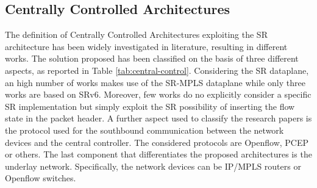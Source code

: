 \subsection{Centrally Controlled Architectures}
\label{sec:central_control}

The definition of Centrally Controlled Architectures exploiting the SR architecture has been widely investigated in literature, resulting in \ccaPapers different works.
The solution proposed has been classified on the basis of three different aspects, as reported in Table \ref{tab:central-control}. Considering the SR dataplane, an high number of works makes use of the SR-MPLS dataplane while only three works are based on SRv6. Moreover, few works do no explicitly consider a specific SR implementation but simply exploit the SR possibility of inserting the flow state in the packet header.
A further aspect used to classify the research papers is the protocol used for the southbound communication between the network devices and the central controller.
The considered protocols are Openflow, PCEP or others.
The last component that differentiates the proposed architectures is the underlay network.
Specifically, the network devices can be IP/MPLS routers or Openflow switches.


